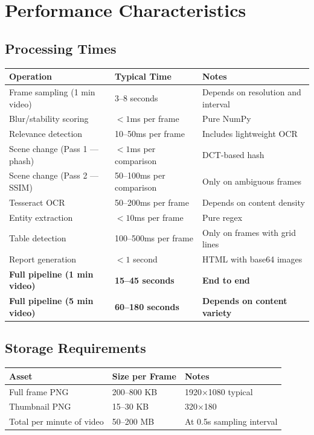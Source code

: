 \documentclass[12pt, a4paper]{article}
\begin{document}
\section{Performance Characteristics}

\subsection{Processing Times}

\begin{tabularx}{\textwidth}{@{} l l X @{}}
    \toprule
    \textbf{Operation} & \textbf{Typical Time} & \textbf{Notes} \\
    \midrule
    Frame sampling (1 min video) & 3--8 seconds & Depends on resolution and interval \\
    Blur/stability scoring & $< 1$ms per frame & Pure NumPy \\
    Relevance detection & 10--50ms per frame & Includes lightweight OCR \\
    Scene change (Pass 1 --- phash) & $< 1$ms per comparison & DCT-based hash \\
    Scene change (Pass 2 --- SSIM) & 50--100ms per comparison & Only on ambiguous frames \\
    Tesseract OCR & 50--200ms per frame & Depends on content density \\
    Entity extraction & $< 10$ms per frame & Pure regex \\
    Table detection & 100--500ms per frame & Only on frames with grid lines \\
    Report generation & $< 1$ second & HTML with base64 images \\
    \midrule
    \textbf{Full pipeline (1 min video)} & \textbf{15--45 seconds} & \textbf{End to end} \\
    \textbf{Full pipeline (5 min video)} & \textbf{60--180 seconds} & \textbf{Depends on content variety} \\
    \bottomrule
\end{tabularx}

\subsection{Storage Requirements}

\begin{tabularx}{\textwidth}{@{} l l X @{}}
    \toprule
    \textbf{Asset} & \textbf{Size per Frame} & \textbf{Notes} \\
    \midrule
    Full frame PNG & 200--800 KB & 1920$\times$1080 typical \\
    Thumbnail PNG & 15--30 KB & 320$\times$180 \\
    Total per minute of video & 50--200 MB & At 0.5s sampling interval \\
    \bottomrule
\end{tabularx}
\end{document}
